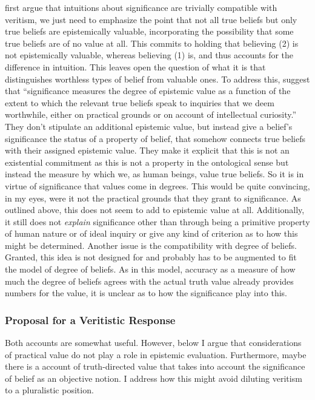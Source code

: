 \documentclass[12pt,numbers=noenddot]{scrartcl}
\begin{document}
\textcite[332]{Ahlstrom-Vij2013} first argue that intuitions about significance are trivially compatible with veritism, we just need to emphasize the point that not all true beliefs but only true beliefs are epistemically valuable, incorporating the possibility that some true beliefs are of no value at all. This commits to holding that believing (2) is not epistemically valuable, whereas believing (1) is, and thus accounts for the difference in intuition. This leaves open the question of what it is that distinguishes worthless types of belief from valuable ones. To address this, \textcite[334]{Ahlstrom-Vij2013} suggest that “significance measures the degree of epistemic value as a function of the extent to which the relevant true beliefs speak to inquiries that we deem worthwhile, either on practical grounds or on account of intellectual curiosity.” They don't stipulate an additional epistemic value, but instead give a belief's significance the status of a property of belief, that somehow connects true beliefs with their assigned epistemic value. They make it explicit that this is not an existential commitment as this is not a property in the ontological sense but instead the measure by which we, as human beings, value true beliefs. So it is in virtue of significance that values come in degrees. This would be quite convincing, in my eyes, were it not the practical grounds that they grant to significance. As outlined above, this does not seem to add to epistemic value at all. Additionally, it still does not \emph{explain} significance other than through being a primitive property of human nature or of ideal inquiry or give any kind of criterion as to how this might be determined. Another issue is the compatibility with degree of beliefs. Granted, this idea is not designed for and probably has to be augmented to fit the model of degree of beliefs. As in this model, accuracy as a measure of how much the degree of beliefs agrees with the actual truth value already provides numbers for the value, it is unclear as to how the significance play into this.

\subsubsection{Proposal for a Veritistic Response}
Both accounts are somewhat useful. However, below I argue that considerations of practical value do not play a role in epistemic evaluation. Furthermore, maybe there is a account of truth-directed value that takes into account the significance of belief as an objective notion. I address how this might avoid diluting veritism to a pluralistic position.
\end{document}
